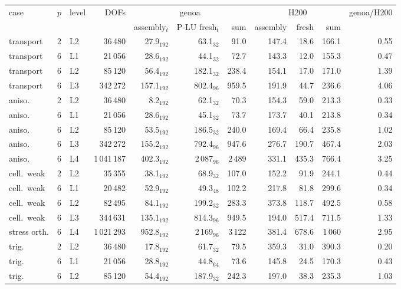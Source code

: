 \begin{tabular}{lrlrrrrrrrr}
\toprule
case & $p$ & level & DOFs & \multicolumn{3}{c}{genoa} & \multicolumn{3}{c}{H200} & genoa/H200\\
\cmidrule(lr){5-7}\cmidrule(lr){8-10}
 & & & & assembly$_t$ & P-LU fresh$_t$ & sum & assembly & fresh & sum & \\
\midrule
transport & 2 & L2 & 36\,480 & 27.9$_{192}$ & 63.1$_{32}$ & 91.0 & 147.4 & 18.6 & 166.1 & 0.55\\
transport & 6 & L1 & 21\,056 & 28.6$_{192}$ & 44.1$_{32}$ & 72.7 & 143.3 & 12.0 & 155.3 & 0.47\\
transport & 6 & L2 & 85\,120 & 56.4$_{192}$ & 182.1$_{32}$ & 238.4 & 154.1 & 17.0 & 171.0 & 1.39\\
transport & 6 & L3 & 342\,272 & 157.1$_{192}$ & 802.4$_{96}$ & 959.5 & 191.9 & 44.7 & 236.6 & 4.06\\
aniso. & 2 & L2 & 36\,480 & 8.2$_{192}$ & 62.1$_{32}$ & 70.3 & 154.3 & 59.0 & 213.3 & 0.33\\
aniso. & 6 & L1 & 21\,056 & 28.6$_{192}$ & 45.1$_{32}$ & 73.7 & 173.7 & 40.1 & 213.8 & 0.34\\
aniso. & 6 & L2 & 85\,120 & 53.5$_{192}$ & 186.5$_{32}$ & 240.0 & 169.4 & 66.4 & 235.8 & 1.02\\
aniso. & 6 & L3 & 342\,272 & 155.2$_{192}$ & 792.4$_{96}$ & 947.6 & 276.7 & 190.7 & 467.4 & 2.03\\
aniso. & 6 & L4 & 1\,041\,187 & 402.3$_{192}$ & 2\,087$_{96}$ & 2\,489 & 331.1 & 435.3 & 766.4 & 3.25\\
cell.\ weak & 2 & L2 & 35\,355 & 38.1$_{192}$ & 68.9$_{32}$ & 107.0 & 152.2 & 91.9 & 244.1 & 0.44\\
cell.\ weak & 6 & L1 & 20\,482 & 52.9$_{192}$ & 49.3$_{48}$ & 102.2 & 217.8 & 81.8 & 299.6 & 0.34\\
cell.\ weak & 6 & L2 & 82\,495 & 84.1$_{192}$ & 199.2$_{32}$ & 283.3 & 373.8 & 118.7 & 492.5 & 0.58\\
cell.\ weak & 6 & L3 & 344\,631 & 135.1$_{192}$ & 814.3$_{96}$ & 949.5 & 194.0 & 517.4 & 711.5 & 1.33\\
stress orth. & 6 & L4 & 1\,021\,293 & 952.8$_{192}$ & 2\,169$_{96}$ & 3\,122 & 381.4 & 678.6 & 1\,060 & 2.95\\
trig. & 2 & L2 & 36\,480 & 17.8$_{192}$ & 61.7$_{32}$ & 79.5 & 359.3 & 31.0 & 390.3 & 0.20\\
trig. & 6 & L1 & 21\,056 & 28.8$_{192}$ & 44.8$_{64}$ & 73.6 & 145.8 & 24.5 & 170.3 & 0.43\\
trig. & 6 & L2 & 85\,120 & 54.4$_{192}$ & 187.9$_{32}$ & 242.3 & 197.0 & 38.3 & 235.3 & 1.03\\

\end{tabular}
